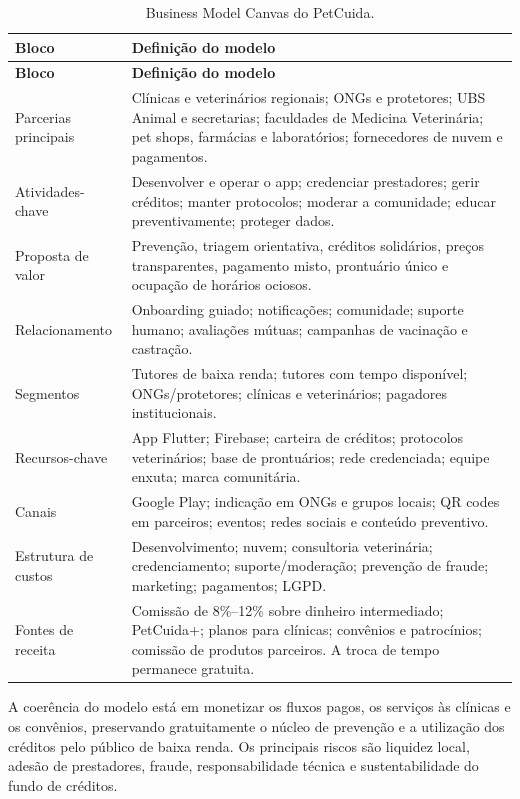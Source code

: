 \documentclass[12pt,a4paper]{article}
\begin{document}
\begin{longtable}{p{3.4cm}p{11.2cm}}
\caption{Business Model Canvas do PetCuida.}\label{tab:bmc}\\
\toprule
\textbf{Bloco} & \textbf{Definição do modelo}\\
\midrule
\endfirsthead
\toprule\textbf{Bloco} & \textbf{Definição do modelo}\\\midrule
\endhead
Parcerias principais & Clínicas e veterinários regionais; ONGs e protetores; UBS Animal e secretarias; faculdades de Medicina Veterinária; pet shops, farmácias e laboratórios; fornecedores de nuvem e pagamentos.\\
Atividades-chave & Desenvolver e operar o app; credenciar prestadores; gerir créditos; manter protocolos; moderar a comunidade; educar preventivamente; proteger dados.\\
Proposta de valor & Prevenção, triagem orientativa, créditos solidários, preços transparentes, pagamento misto, prontuário único e ocupação de horários ociosos.\\
Relacionamento & Onboarding guiado; notificações; comunidade; suporte humano; avaliações mútuas; campanhas de vacinação e castração.\\
Segmentos & Tutores de baixa renda; tutores com tempo disponível; ONGs/protetores; clínicas e veterinários; pagadores institucionais.\\
Recursos-chave & App Flutter; Firebase; carteira de créditos; protocolos veterinários; base de prontuários; rede credenciada; equipe enxuta; marca comunitária.\\
Canais & Google Play; indicação em ONGs e grupos locais; QR codes em parceiros; eventos; redes sociais e conteúdo preventivo.\\
Estrutura de custos & Desenvolvimento; nuvem; consultoria veterinária; credenciamento; suporte/moderação; prevenção de fraude; marketing; pagamentos; LGPD.\\
Fontes de receita & Comissão de 8\%--12\% sobre dinheiro intermediado; PetCuida+; planos para clínicas; convênios e patrocínios; comissão de produtos parceiros. A troca de tempo permanece gratuita.\\
\bottomrule
\end{longtable}

A coerência do modelo está em monetizar os fluxos pagos, os serviços às clínicas e os convênios, preservando gratuitamente o núcleo de prevenção e a utilização dos créditos pelo público de baixa renda. Os principais riscos são liquidez local, adesão de prestadores, fraude, responsabilidade técnica e sustentabilidade do fundo de créditos.
\end{document}
